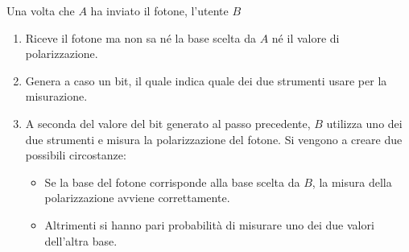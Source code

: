 Una volta che $A$ ha inviato il fotone, l'utente $B$
\begin{enumerate}
	\item Riceve il fotone ma non sa n\'e la base scelta da $A$ n\'e il valore di polarizzazione.
	\item Genera a caso un bit, il quale indica quale dei due strumenti usare per la misurazione.
	\item A seconda del valore del bit generato al passo precedente, $B$ utilizza uno dei due strumenti e misura la
	      polarizzazione del fotone. Si vengono a creare due possibili circostanze:
	      \begin{itemize}
		      \item Se la base del fotone corrisponde alla base scelta da $B$, la misura della polarizzazione avviene
		            correttamente.
		      \item Altrimenti si hanno pari probabilit\`a di misurare uno dei due valori dell'altra base.
	      \end{itemize}
\end{enumerate}